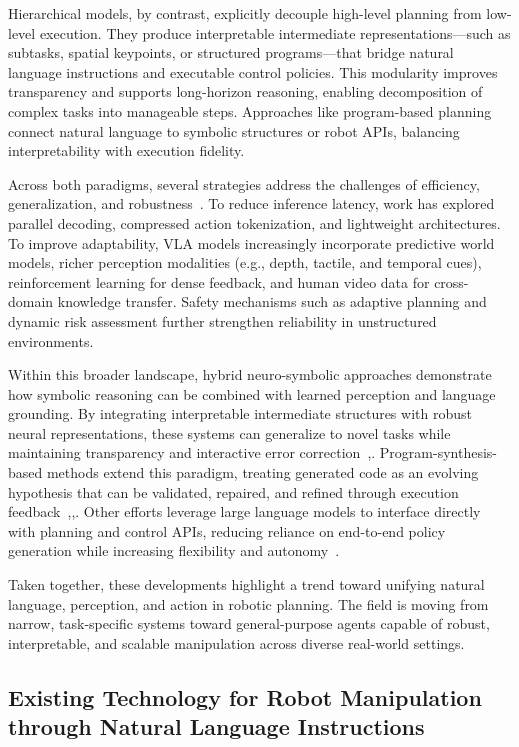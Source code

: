 \documentclass[12pt]{extarticle}
\begin{document}
Hierarchical models, by contrast, explicitly decouple high-level planning from low-level execution. They produce interpretable intermediate representations—such as subtasks, spatial keypoints, or structured programs—that bridge natural language instructions and executable control policies. This modularity improves transparency and supports long-horizon reasoning, enabling decomposition of complex tasks into manageable steps. Approaches like program-based planning connect natural language to symbolic structures or robot APIs, balancing interpretability with execution fidelity.

Across both paradigms, several strategies address the challenges of efficiency, generalization, and robustness~\cite{vla-in-robot}. To reduce inference latency, work has explored parallel decoding, compressed action tokenization, and lightweight architectures. To improve adaptability, VLA models increasingly incorporate predictive world models, richer perception modalities (e.g., depth, tactile, and temporal cues), reinforcement learning for dense feedback, and human video data for cross-domain knowledge transfer. Safety mechanisms such as adaptive planning and dynamic risk assessment further strengthen reliability in unstructured environments.

Within this broader landscape, hybrid neuro-symbolic approaches demonstrate how symbolic reasoning can be combined with learned perception and language grounding. By integrating interpretable intermediate structures with robust neural representations, these systems can generalize to novel tasks while maintaining transparency and interactive error correction~\cite{enhancing-interpret},\cite{learning-neuro-symbolic}. Program-synthesis-based methods extend this paradigm, treating generated code as an evolving hypothesis that can be validated, repaired, and refined through execution feedback~\cite{hycodepolicy},\cite{code-as-policies},\cite{code-as-symbolic-planner}. Other efforts leverage large language models to interface directly with planning and control APIs, reducing reliance on end-to-end policy generation while increasing flexibility and autonomy~\cite{audere}.

Taken together, these developments highlight a trend toward unifying natural language, perception, and action in robotic planning. The field is moving from narrow, task-specific systems toward general-purpose agents capable of robust, interpretable, and scalable manipulation across diverse real-world settings.


\subsection{Existing Technology for Robot Manipulation through Natural Language Instructions}
\end{document}
